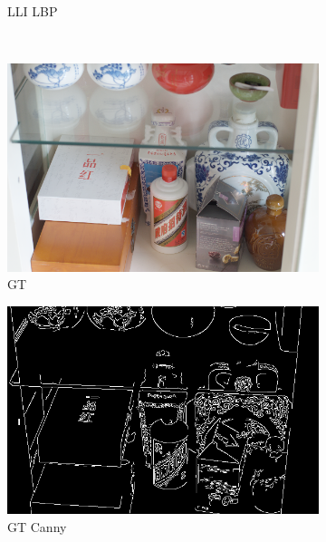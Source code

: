 \documentclass[a4paper]{ctexart}
\begin{document}
\begin{figure}[htb]
\begin{subfigure}{0.19\textwidth}
			\captionsetup{font=scriptsize}
			\caption{LLI LBP}
			\label{fig: LLI_lbp}
		\end{subfigure}\\
		\begin{subfigure}{0.19\textwidth}
			\includegraphics[width=\linewidth]{picture/LLIE/My Architecture/Edge Detection/normal00044}
			\captionsetup{font=scriptsize}
			\caption{GT}
			\label{fig: GI}
		\end{subfigure}
		\begin{subfigure}{0.19\textwidth}
			\includegraphics[width=\linewidth]{picture/LLIE/My Architecture/Edge Detection/normal00044_canny}
			\captionsetup{font=scriptsize}
			\caption{GT Canny}
			\label{fig: GT_canny}
		\end{subfigure}
		\begin{subfigure}{0.19\textwidth}

\end{subfigure}
\end{figure}
\end{document}
